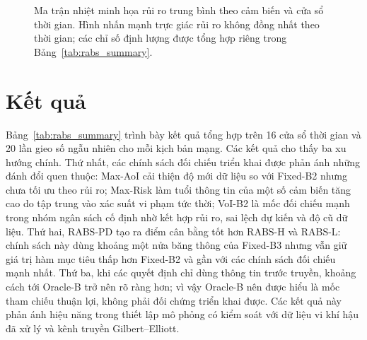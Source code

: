 \documentclass[10pt]{article}
\begin{document}
\begin{figure}[ht]
\centering
{}
\caption{Ma trận nhiệt minh họa rủi ro trung bình theo cảm biến và cửa sổ thời gian. Hình nhấn mạnh trực giác rủi ro không đồng nhất theo thời gian; các chỉ số định lượng được tổng hợp riêng trong Bảng~\ref{tab:rabs_summary}.}
\label{fig:risk_heatmap_loop_window}
\end{figure}

\section{Kết quả}
Bảng~\ref{tab:rabs_summary} trình bày kết quả tổng hợp trên 16 cửa sổ thời gian và 20 lần gieo số ngẫu nhiên cho mỗi kịch bản mạng. Các kết quả cho thấy ba xu hướng chính. Thứ nhất, các chính sách đối chiếu triển khai được phản ánh những đánh đổi quen thuộc: Max-AoI cải thiện độ mới dữ liệu so với Fixed-B2 nhưng chưa tối ưu theo rủi ro; Max-Risk làm tuổi thông tin của một số cảm biến tăng cao do tập trung vào xác suất vi phạm tức thời; VoI-B2 là mốc đối chiếu mạnh trong nhóm ngân sách cố định nhờ kết hợp rủi ro, sai lệch dự kiến và độ cũ dữ liệu. Thứ hai, RABS-PD tạo ra điểm cân bằng tốt hơn RABS-H và RABS-L: chính sách này dùng khoảng một nửa băng thông của Fixed-B3 nhưng vẫn giữ giá trị hàm mục tiêu thấp hơn Fixed-B2 và gần với các chính sách đối chiếu mạnh nhất. Thứ ba, khi các quyết định chỉ dùng thông tin trước truyền, khoảng cách tới Oracle-B trở nên rõ ràng hơn; vì vậy Oracle-B nên được hiểu là mốc tham chiếu thuận lợi, không phải đối chứng triển khai được. Các kết quả này phản ánh hiệu năng trong thiết lập mô phỏng có kiểm soát với dữ liệu vi khí hậu đã xử lý và kênh truyền Gilbert--Elliott.
\end{document}
